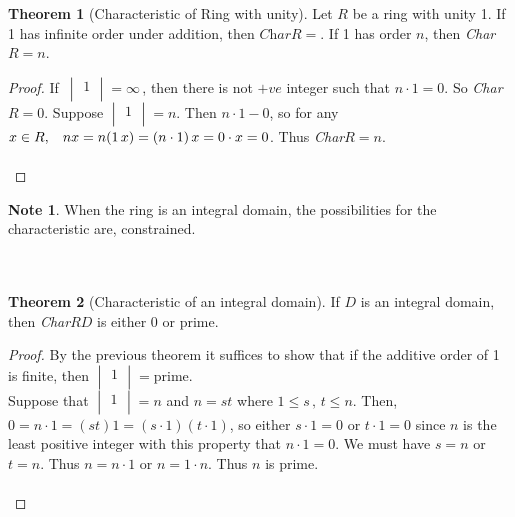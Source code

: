 \documentclass[11pt,a4paper]{article}
\theoremstyle{definition}
\newtheorem{thm}{Theorem}[subsection]
\newtheorem*{note}{Note}
\begin{document}
\begin{thm}[Characteristic of Ring with unity]
Let $R$ be a ring with unity 1. If 1 has infinite order under addition, then $\textit{Char}R = $. If 1 has order $n$, then \textit{Char}$R = n$.\\
\end{thm}


\begin{proof}
If $\,\begin{vmatrix}
1\\
\end{vmatrix} = \infty\,$, then there is not $+ve$ integer such that $n\cdot 1 = 0$. So \textit{Char}$R = 0$. Suppose $\begin{vmatrix}
1\\
\end{vmatrix} = n$. Then $n\cdot 1 - 0$, so for any $x\in R,\hspace{0.3cm} nx = n(1\, x) = (n\cdot 1)\, x = 0\cdot x = 0$. Thus \textit{Char}$R = n$.\\\\
\end{proof}





\begin{note}
When the ring is an integral domain, the possibilities for the characteristic are, constrained.\\\\\
\end{note}







\begin{thm}[Characteristic of an integral domain]
If $D$ is an integral domain, then \textit{Char}$RD$ is either $0$ or prime.\\
\end{thm}


\begin{proof}
By the previous theorem it suffices to show that if the additive order of 1 is finite, then $\begin{vmatrix}
1\\
\end{vmatrix} = $prime.\\
Suppose that $\begin{vmatrix}
1\\
\end{vmatrix} = n$ and $n = st$ where $1\leq s\, , \, t\leq n$. Then, $0 = n\cdot 1 = (st)1 = (s\cdot 1)(t\cdot 1)$, so either $s\cdot 1 = 0$ or $t\cdot 1 = 0$ since $n$ is the least positive integer with this property that $n\cdot 1 = 0$. We must have $s=n$ or $t=n$. Thus $n = n\cdot 1$ or $n = 1\cdot n$. Thus $n$ is prime.\\\\
\end{proof}
\end{document}
